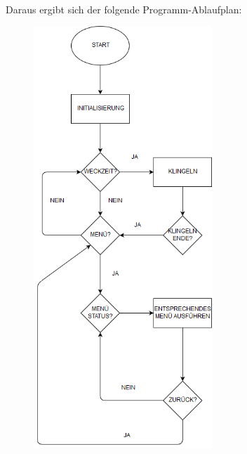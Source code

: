 \documentclass[openright,twoside,11pt,a4paper]{scrartcl}
\begin{document}
\begin{flushleft}
	 	\ \\
	 	Daraus ergibt sich der folgende Programm-Ablaufplan:
	 	\begin{figure}[htbp] 
	 		\centering
	 		\includegraphics[width=0.6\textwidth]{Untitled Diagram.png}
	 		\label{fig:Bild1}
	 	\end{figure}

	\end{flushleft}
\end{document}
